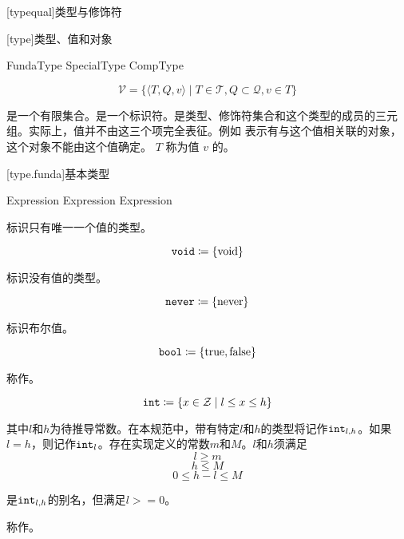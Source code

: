 
[typequal]{类型与修饰符}

[type]{类型、值和对象}

\begin{bnf}
 \br
    FundaType \br
    SpecialType \br
    CompType
\end{bnf}

$$ \mathcal{V} = \{ \langle T, Q, v \rangle \mid T \in \mathcal{T}, Q \subset \mathcal{Q}, v \in T \} $$

\pnum
{}是一个有限集合。是一个标识符。是类型、修饰符集合和这个类型的成员的三元组。\enternote 实际上，值并不由这三个项完全表征。例如  表示有与这个值相关联的对象，这个对象不能由这个值确定。 \exitnote $T$ 称为值 $v$ 的。

[type.funda]{基本类型}

\begin{bnf}
 \br
     \br
     \br
     \br
     \br
     \br
     \terminal{<} Expression \terminal{,} Expression \terminal{>} \br
     \br
     \terminal{<} Expression \terminal{>} \br
\end{bnf}

\pnum
{}标识只有唯一一个值的类型。

$$\texttt{void} \coloneqq \{ \mathrm{void} \}$$

\pnum
{}标识没有值的类型。

$$\texttt{never} \coloneqq \{ \mathrm{never} \}$$

\pnum
{} 标识布尔值。

$$\texttt{bool} \coloneqq \{ \mathrm{true}, \mathrm{false} \}$$

\pnum
{} 称作。

$$\texttt{int} \coloneqq \{ x \in \mathcal{Z} \mid l \le x \le h \} $$

其中$l$和$h$为待推导常数。在本规范中，带有特定$l$和$h$的类型将记作$\texttt{int}_{l, h}$。如果$l = h$，则记作$\texttt{int}_l$。存在实现定义的常数$m$和$M$。$l$和$h$须满足
$$ l \ge m $$
$$ h \le M $$
$$ 0 \le h - l \le M $$

是$\texttt{int}_{l,h}$的别名，但满足$l>=0$。

\pnum
{}称作。

